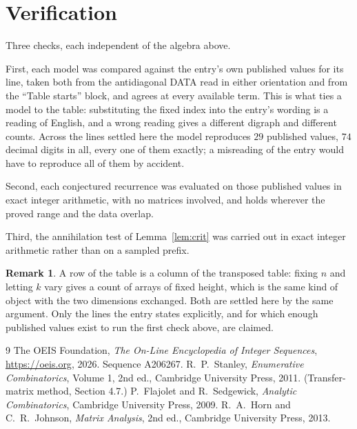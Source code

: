 \documentclass[11pt,a4paper]{article}
\theoremstyle{plain}
\theoremstyle{definition}
\newtheorem{remark}[theorem]{Remark}
\begin{document}
\section{Verification}

Three checks, each independent of the algebra above.

First, each model was compared against the entry's own published values for its line, taken
both from the antidiagonal DATA read in either orientation and from the ``Table starts''
block, and agrees at every available term. This is what ties a model to the table:
substituting the fixed index into the entry's wording is a reading of English, and a wrong
reading gives a different digraph and different counts. Across the lines settled here the
model reproduces $29$ published values, $74$ decimal digits in all, every one of
them exactly; a misreading of the entry would have to reproduce all of them by accident.

Second, each conjectured recurrence was evaluated on those published values in exact
integer arithmetic, with no matrices involved, and holds wherever the proved range and the
data overlap.

Third, the annihilation test of Lemma~\ref{lem:crit} was carried out in exact integer
arithmetic rather than on a sampled prefix.

\begin{remark}
A row of the table is a column of the transposed table: fixing $n$ and letting $k$ vary gives a
count of arrays of fixed height, which is the same kind of object with the two dimensions
exchanged. Both are settled here by the same argument. Only the lines the entry states
explicitly, and for which enough published values exist to run the first check above, are
claimed.
\end{remark}

\begin{thebibliography}{9}
 The OEIS Foundation, \emph{The On-Line Encyclopedia of Integer
Sequences}, \url{https://oeis.org}, 2026. Sequence A206267.
 R.~P.~Stanley, \emph{Enumerative Combinatorics}, Volume 1, 2nd ed.,
Cambridge University Press, 2011. (Transfer-matrix method, Section 4.7.)
 P.~Flajolet and R.~Sedgewick, \emph{Analytic Combinatorics}, Cambridge
University Press, 2009.
 R.~A.~Horn and C.~R.~Johnson, \emph{Matrix Analysis}, 2nd ed., Cambridge
University Press, 2013.
\end{thebibliography}
\end{document}
